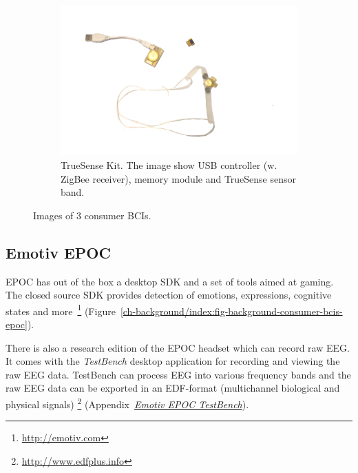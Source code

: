 \documentclass[a4paper,10pt,english,lof,lot,twoside]{puthesis}
\begin{document}
\begin{figure}
\begin{subfigure}[t]{0.45\linewidth}
\includegraphics[width=1.000\linewidth]{bci-truesense-kit.jpg}
\caption[TrueSense Kit]{TrueSense Kit. The image show USB controller (w. ZigBee receiver), memory module and TrueSense sensor band.}\label{ch-background/index:fig-background-consumer-bcis-truesense}\end{subfigure}
\caption[Images of consumer BCIs]{Images of 3 consumer BCIs.}\label{ch-background/index:fig-background-consumer-bcis-images}

\end{figure}



\subsection{Emotiv EPOC}
\label{ch-background/index:emotiv-epoc}\label{ch-background/index:fig-background-consumer-bcis-images}\label{ch-background/index:ch-background-epoc}
EPOC has out of the box a desktop SDK and a set of tools aimed at gaming. The
closed source SDK provides detection of emotions, expressions, cognitive states
and more \footnote{
\href{http://emotiv.com}{http://emotiv.com}
} (Figure \ref{ch-background/index:fig-background-consumer-bcis-epoc}).

There is also a research edition of the EPOC headset which can record raw
EEG. It comes with the \emph{TestBench} desktop application for
recording and viewing the raw EEG data. TestBench can process EEG into
various frequency bands and the raw EEG data can be exported in an EDF-format
(multichannel biological and physical signals) \footnote{
\href{http://www.edfplus.info}{http://www.edfplus.info}
} (Appendix {\hyperref[appendix_background_testbench:appendix-background-testbench]{\emph{Emotiv EPOC TestBench}}}).
\end{document}
